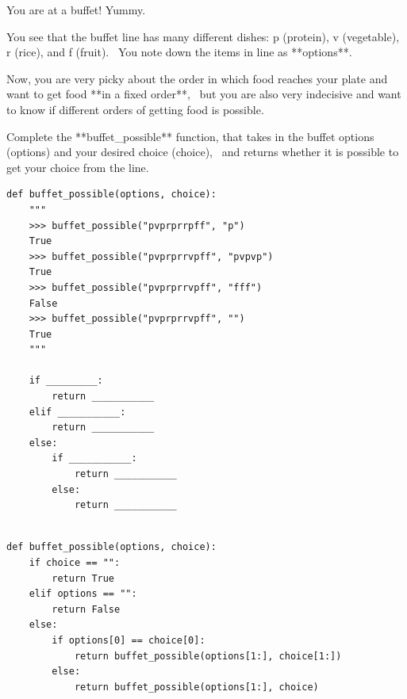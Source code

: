 \begin{blocksection}
\question
You are at a buffet! Yummy.

You see that the buffet line has many different dishes: p (protein), v (vegetable), r (rice), and f (fruit). \
You note down the items in line as **options**.

Now, you are very picky about the order in which food reaches your plate and want to get food **in a fixed order**, \
but you are also very indecisive and want to know if different orders of getting food is possible.

Complete the **buffet\_possible** function, that takes in the buffet options (options) and your desired choice (choice), \
and returns whether it is possible to get your choice from the line.

\begin{lstlisting}
def buffet_possible(options, choice):
    """
    >>> buffet_possible("pvprprrpff", "p")
    True
    >>> buffet_possible("pvprprrvpff", "pvpvp")
    True
    >>> buffet_possible("pvprprrvpff", "fff")
    False
    >>> buffet_possible("pvprprrvpff", "")
    True
    """

    if _________:
        return ___________
    elif ___________:
        return ___________
    else:
        if ___________:
            return ___________
        else:
            return ___________
    
\end{lstlisting}
\end{blocksection}

\begin{blocksection}
\begin{solution}
\begin{lstlisting}
def buffet_possible(options, choice):
    if choice == "":
        return True
    elif options == "":
        return False
    else:
        if options[0] == choice[0]:
            return buffet_possible(options[1:], choice[1:])
        else:
            return buffet_possible(options[1:], choice)
\end{lstlisting}
\end{solution}
\end{blocksection}